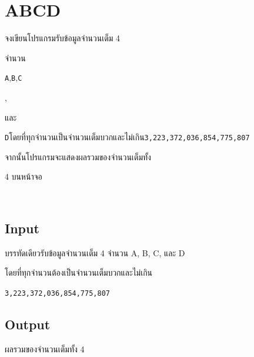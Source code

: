 \documentclass{article}
\begin{document}
\section*{ABCD}

{จงเขียนโปรแกรมรับข้อมูลจำนวนเต็ม 4

จำนวน}\texttt{A}{,}\texttt{B}{,}\texttt{C}{,

และ}\texttt{D}{โดยที่ทุกจำนวนเป็นจำนวนเต็มบวกและไม่เกิน}\texttt{3,223,372,036,854,775,807}{จากนั้นโปรแกรมจะแสดงผลรวมของจำนวนเต็มทั้ง

4 บนหน้าจอ}\\



\subsection*{Input}
{บรรทัดเดียวรับข้อมูลจำนวนเต็ม 4 จำนวน A, B, C, และ D

โดยที่ทุกจำนวนต้องเป็นจำนวนเต็มบวกและไม่เกิน}\texttt{3,223,372,036,854,775,807}\\



\subsection*{Output}
{ผลรวมของจำนวนเต็มทั้ง 4}\\
\end{document}

